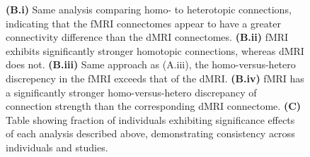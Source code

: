 \begin{figure}[t!]
{\textbf{(B.i)} Same analysis comparing homo- to heterotopic connections, indicating that the fMRI connectomes appear to have a greater connectivity difference than the dMRI connectomes.
\textbf{(B.ii)} fMRI exhibits significantly stronger homotopic connections, whereas dMRI does not.
\textbf{(B.iii)} Same approach as (A.iii), the homo-versus-hetero discrepency in the fMRI exceeds that of the dMRI.
\textbf{(B.iv)} fMRI has a significantly stronger homo-versus-hetero discrepancy of connection strength than the  corresponding dMRI connectome. 
\textbf{(C)} Table showing fraction of individuals exhibiting significance effects of each analysis described above, demonstrating consistency across individuals and studies.}
\label{fig:siem}
\end{figure}
